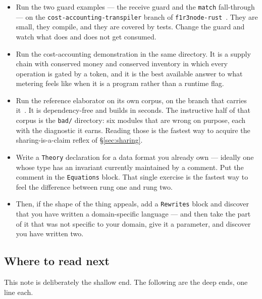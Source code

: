 \begin{itemize}[leftmargin=1.6em,itemsep=3pt]
\item Run the two guard examples --- the receive guard and the \texttt{match}
  fall-through --- on the \texttt{cost-accounting-transpiler} branch of
  \texttt{f1r3node-rust}~\cite{f1r3node}. They are small, they compile, and they are covered by
  tests. Change the guard and watch what does and does not get consumed.
\item Run the cost-accounting demonstration in the same directory. It is a
  supply chain with conserved money and conserved inventory in which every
  operation is gated by a token, and it is the best available answer to what
  metering feels like when it is a program rather than a runtime flag.
\item Run the reference elaborator on its own corpus, on the branch that
  carries it~\cite{modulesyntax}. It is dependency-free and builds in
  seconds. The instructive half of that corpus is the
  \texttt{bad/} directory: six modules that are wrong on purpose, each with the
  diagnostic it earns. Reading those is the fastest way to acquire the
  sharing-is-a-claim reflex of \S\ref{sec:sharing}.
\item Write a \texttt{Theory} declaration for a data format you already own ---
  ideally one whose type has an invariant currently maintained by a comment. Put
  the comment in the \texttt{Equations} block. That single exercise is the
  fastest way to feel the difference between rung one and rung two.
\item Then, if the shape of the thing appeals, add a \texttt{Rewrites} block and
  discover that you have written a domain-specific language --- and then take
  the part of it that was not specific to your domain, give it a parameter, and
  discover you have written two.
\end{itemize}

\subsection{Where to read next}

This note is deliberately the shallow end. The following are the deep ends, one
line each.

